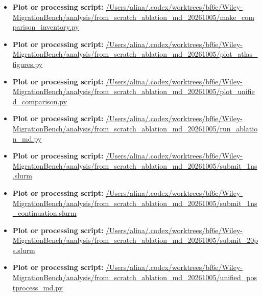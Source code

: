 \begin{itemize}[leftmargin=1.4em,noitemsep]
\item \textbf{Plot or processing script:} \url{/Users/alina/.codex/worktrees/bf6e/Wiley-MigrationBench/analysis/from_scratch_ablation_md_20261005/make_comparison_inventory.py}
\item \textbf{Plot or processing script:} \url{/Users/alina/.codex/worktrees/bf6e/Wiley-MigrationBench/analysis/from_scratch_ablation_md_20261005/plot_atlas_figures.py}
\item \textbf{Plot or processing script:} \url{/Users/alina/.codex/worktrees/bf6e/Wiley-MigrationBench/analysis/from_scratch_ablation_md_20261005/plot_unified_comparison.py}
\item \textbf{Plot or processing script:} \url{/Users/alina/.codex/worktrees/bf6e/Wiley-MigrationBench/analysis/from_scratch_ablation_md_20261005/run_ablation_md.py}
\item \textbf{Plot or processing script:} \url{/Users/alina/.codex/worktrees/bf6e/Wiley-MigrationBench/analysis/from_scratch_ablation_md_20261005/submit_1ns.slurm}
\item \textbf{Plot or processing script:} \url{/Users/alina/.codex/worktrees/bf6e/Wiley-MigrationBench/analysis/from_scratch_ablation_md_20261005/submit_1ns_continuation.slurm}
\item \textbf{Plot or processing script:} \url{/Users/alina/.codex/worktrees/bf6e/Wiley-MigrationBench/analysis/from_scratch_ablation_md_20261005/submit_20ps.slurm}
\item \textbf{Plot or processing script:} \url{/Users/alina/.codex/worktrees/bf6e/Wiley-MigrationBench/analysis/from_scratch_ablation_md_20261005/unified_postprocess_md.py}
\end{itemize}
